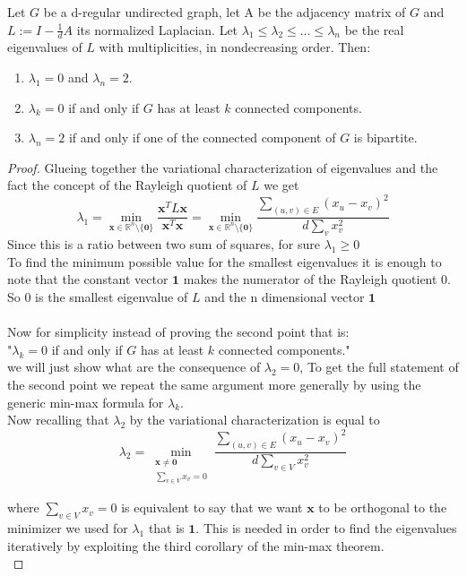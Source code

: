 \begin{theorem}
Let $ G $ be a d-regular undirected graph, let A be the adjacency matrix of $ G $ and $ L:= I-\frac{1}{d}A $ its normalized Laplacian. Let  $\lambda_1 \leq \lambda_2 \leq \dots \leq \lambda_n$ be the real eigenvalues of $ L $ with multiplicities, in nondecreasing order. Then:
\begin{enumerate}
\item $ \lambda_1=0 $ and $ \lambda_n=2 $.
\item $ \lambda_k=0 $ if and only if $ G $ has at least $ k $ connected components.
\item $ \lambda_n=2 $ if and only if one of the connected component of $ G $ is bipartite.
\end{enumerate}
\begin{proof}
Glueing together the variational characterization of eigenvalues and the fact the concept of the Rayleigh quotient of $ L $ we get
\[\lambda_1 
= \min_{\mathbf{x} \in \mathbb{R}^n \setminus \{\mathbf{0}\}}\frac{\mathbf{x}^TL\mathbf{x}}{\mathbf{x}^T\mathbf{x}} 
=  \min_{\mathbf{x} \in \mathbb{R}^n \setminus \{\mathbf{0}\}} \frac{\sum_{(u,v) \in E}{(x_u - x_v)^2}}{d \sum_{v}{x_v^2}}\]
Since this is a ratio between two sum of squares, for sure $\lambda_1 \geq 0 $ \\
To find the minimum possible value for the smallest eigenvalues it is enough to note that the constant vector $ \mathbf{1} $ makes the numerator of the Rayleigh quotient $ 0 $. So $ 0 $ is the smallest eigenvalue of $ L $ and the n dimensional vector $ \mathbf{1} $
\\
\medskip
\\
Now for simplicity instead of proving  the second point that is: 
\\ \medskip
"$ \lambda_k=0 $ if and only if $ G $ has at least $ k $ connected components."
\\
we will just show what are the consequence of $ \lambda_2=0 $, 
To get the full statement of the second point we repeat the same argument more generally by using the generic min-max formula for $ \lambda_k $. 
\\
Now recalling that $ \lambda_2 $ by the variational characterization is equal to
\[\lambda_2 = \min_{\substack{\mathbf{x} \ne \mathbf{0} \\ \sum_{v \in V} x_v = 0}}  \frac{\sum_{(u,v)\in E}(x_u-x_v)^2}{d \sum_{v \in V} x_v^2 } \]

where $ {\sum_{v \in V} x_v = 0} $ is equivalent to say that we want $ \mathbf{x} $ to be orthogonal to the minimizer we used for $ \lambda_1 $ that is 
$ \mathbf{1} $. This is needed in order to find the eigenvalues iteratively by exploiting the third corollary of the min-max theorem. \\


\end{proof}
\end{theorem}
